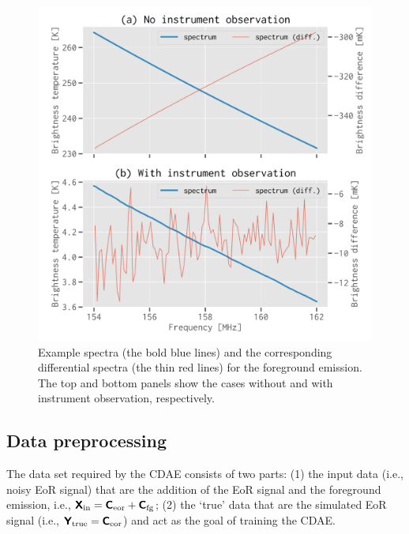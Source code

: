 \documentclass[letters,a4paper,fleqn,usenatbib]{mnras}
\newcommand{\R}[1]{\mathrm{#1}}
\newcommand{\M}[1]{\mathbfss{#1}}
\begin{document}
\begin{figure}
  \centering
  \includegraphics[width=\columnwidth]{simudata}
  \caption{\label{fig:simudata}%
    Example spectra (the bold blue lines) and the corresponding
    differential spectra (the thin red lines) for the foreground
    emission.
    The top and bottom panels show the cases without and with
    instrument observation, respectively.
  }
\end{figure}


\subsection{Data preprocessing}
\label{sec:preprocessing}

The data set required by the CDAE consists of two parts:
(1) the input data (i.e., noisy EoR signal) that are the addition of
the EoR signal and the foreground emission, i.e.,
$\M{X}_{\R{in}} = \M{C}_{\R{eor}} + \M{C}_{\R{fg}}$;
(2) the `true' data that are the simulated EoR signal
(i.e., $\M{Y}_{\R{true}} = \M{C}_{\R{eor}}$)
and act as the goal of training the CDAE.
\end{document}
